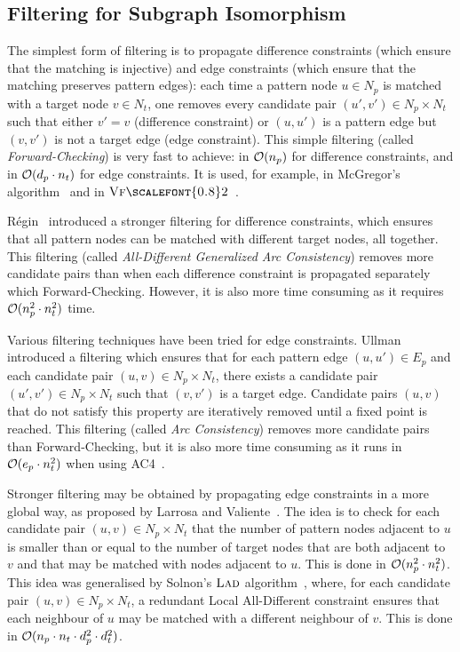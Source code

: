 \documentclass{llncs}
\newcommand{\VFtwo}{$\textsc{Vf{\scalefont{0.8}2}}$\xspace}
\newcommand{\LAD}{$\textsc{Lad}$\xspace}
\begin{document}
\subsection{Filtering for Subgraph Isomorphism}

The simplest form of filtering is to propagate difference constraints (which ensure that the
matching is injective) and edge constraints (which ensure that the matching preserves pattern
edges): each time a pattern node $u\in N_p$ is matched with a target node $v\in N_t$, one removes
every candidate pair $(u',v')\in N_p\times N_t$ such that either $v'=v$ (difference constraint) or
$(u,u')$ is a pattern edge but $(v,v')$ is not a target edge (edge constraint). This simple
filtering (called \emph{Forward-Checking}) is very fast to achieve: in ${\cal O}(n_p)$ for
difference constraints, and in ${\cal O}(d_p\cdot n_t)$ for edge constraints. It is used, for
example, in McGregor's algorithm~\cite{mcgregor79} and in \VFtwo{}~\cite{Cordella:2004}.

R\'egin~\cite{regin} introduced a stronger filtering for difference constraints, which ensures that
all pattern nodes can be matched with different target nodes, all together. This filtering (called
\emph{All-Different Generalized Arc Consistency}) removes more candidate pairs than when each
difference constraint is propagated separately which Forward-Checking. However, it is also more time
consuming as it requires ${\cal O}(n_p^2\cdot n_t^2)$ time.

Various filtering techniques have been tried for edge constraints. Ullman~\cite{ullman} introduced a
filtering which ensures that for each pattern edge $(u,u')\in E_p$ and each candidate pair $(u,v)\in
N_p\times N_t$, there exists a candidate pair $(u',v')\in N_p\times N_t$ such that $(v,v')$ is a
target edge. Candidate pairs $(u,v)$ that do not satisfy this property are iteratively removed
until a fixed point is reached. This filtering (called \emph{Arc Consistency}) removes more
candidate pairs than Forward-Checking, but it is also more time consuming as it
runs in ${\cal
O}(e_p\cdot n_t^2)$ when using AC4~\cite{MH86}.

Stronger filtering may be obtained by propagating edge constraints in a more global way, as proposed
by Larrosa and Valiente~\cite{LV02}. The idea is to check for each candidate pair $(u,v)\in
N_p\times N_t$ that the number of pattern nodes adjacent to $u$ is smaller than or equal to the
number of target nodes that are both adjacent to $v$ and that may be matched with nodes adjacent to
$u$. This is done in ${\cal O}(n_p^2\cdot n_t^2)$. This idea was generalised by
Solnon's \LAD algorithm~\cite{Solnon:2010}, where, for each candidate pair $(u,v)\in N_p\times N_t$, a redundant Local
All-Different constraint ensures that each neighbour of $u$ may be matched with a different
neighbour of $v$. This is done in ${\cal O}(n_p\cdot n_t\cdot d_p^2\cdot d_t^2)$.
\end{document}
